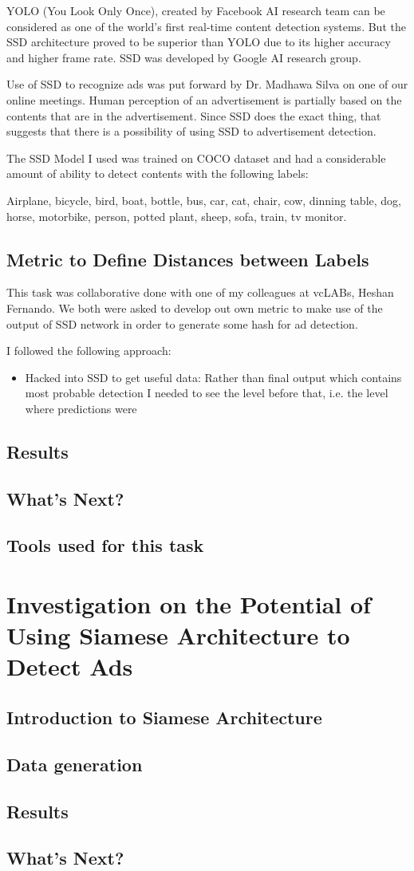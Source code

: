 YOLO (You Look Only Once), created by Facebook AI research team can be considered as one of the world's first real-time content detection systems. But the SSD architecture proved to be superior than YOLO due to its higher accuracy and higher frame rate. SSD was developed by Google AI research group.

Use of SSD to recognize ads was put forward by Dr. Madhawa Silva on one of our online meetings. Human perception of an advertisement is partially based on the contents that are in the advertisement. Since SSD does the exact thing, that suggests that there is a possibility of using SSD to advertisement detection.

The SSD Model I used was trained on COCO dataset and had a considerable amount of ability to detect contents with the following labels:

Airplane, bicycle, bird, boat, bottle, bus, car, cat, chair, cow, dinning table, dog, horse, motorbike, person, potted plant, sheep, sofa, train, tv monitor.

\subsection{Metric to Define Distances between Labels}

This task was collaborative done with one of my colleagues at vcLABs, Heshan Fernando. We both were asked to develop out own metric to make use of the output of SSD network in order to generate some hash for ad detection.

I followed the following approach:
\begin{itemize}
\item Hacked into SSD to get useful data: Rather than final output which contains most probable detection I needed to see the level before that, i.e. the level where predictions were
\end{itemize}

\subsection{Results}
\blindtext
\subsection{What's Next?}
\subsection{Tools used for this task}
\section{Investigation on the Potential of Using Siamese Architecture to Detect Ads}
\subsection{Introduction to Siamese Architecture}
\subsection{Data generation}
\subsection{Results}
\subsection{What's Next?}